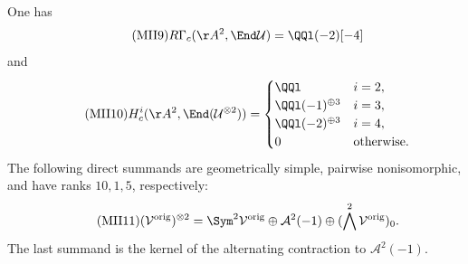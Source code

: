 \begin{theorem}\label{mii:mii:tensor}
One has
\begin{equation}\tag{MII9}\label{mii:mii:endU}
 R\Gamma_c(\AA^2,\End\mathcal U)=\QQl(-2)[-4]
\end{equation}
and
\begin{equation}\tag{MII10}\label{mii:mii:endtensor}
 H_c^i(\AA^2,\End(\mathcal U^{\otimes2}))=
 \begin{cases}
 \QQl&i=2,\\
 \QQl(-1)^{\oplus3}&i=3,\\
 \QQl(-2)^{\oplus3}&i=4,\\
 0&\text{otherwise}.
 \end{cases}
\end{equation}
The following direct summands are geometrically simple, pairwise
nonisomorphic, and have ranks $10,1,5$, respectively:
\begin{equation}\tag{MII11}\label{mii:mii:decomposition}
 (\mathcal V^{\rm orig})^{\otimes2}
 =\Sym^2\mathcal V^{\rm orig}
 \oplus\mathcal A^2(-1)
 \oplus(\bigwedge^2\mathcal V^{\rm orig})_0.
\end{equation}
The last summand is the kernel of the alternating contraction to
$\mathcal A^2(-1)$.
\end{theorem}
